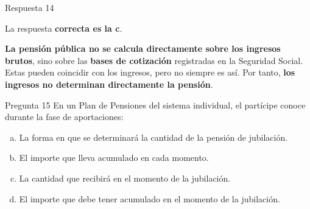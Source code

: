 \documentclass[
  ignorenonframetext,
  aspectratio=54,
  spanish,
]{beamer}
\providecommand{\tightlist}{%
  \setlength{\itemsep}{0pt}\setlength{\parskip}{0pt}}
\begin{document}
\begin{frame}{Respuesta 14}
\label{respuesta-14}
\begin{tcolorbox}[enhanced jigsaw, rightrule=.15mm, colback=white, arc=.35mm, colframe=quarto-callout-tip-color-frame, leftrule=.75mm, bottomrule=.15mm, left=2mm, toprule=.15mm, opacityback=0, breakable]
\begin{minipage}[t]{5.5mm}
\textcolor{quarto-callout-tip-color}{\faLightbulb}
\end{minipage}%
\begin{minipage}[t]{\textwidth - 5.5mm}

La respuesta \textbf{correcta es la c}.

\textbf{La pensión pública no se calcula directamente sobre los ingresos
brutos}, sino sobre las \textbf{bases de cotización} registradas en la
Seguridad Social. Estas pueden coincidir con los ingresos, pero no
siempre es así. Por tanto, \textbf{los ingresos no determinan
directamente la pensión}.

\end{minipage}%
\end{tcolorbox}
\end{frame}

\begin{frame}{Pregunta 15}
\label{pregunta-15}
En un Plan de Pensiones del sistema individual, el partícipe conoce
durante la fase de aportaciones:

\begin{enumerate}
[a.]
\tightlist
\item
  La forma en que se determinará la cantidad de la pensión de
  jubilación.\\
\item
  El importe que lleva acumulado en cada momento.\\
\item
  La cantidad que recibirá en el momento de la jubilación.\\
\item
  El importe que debe tener acumulado en el momento de la jubilación.
\end{enumerate}
\end{frame}
\end{document}
